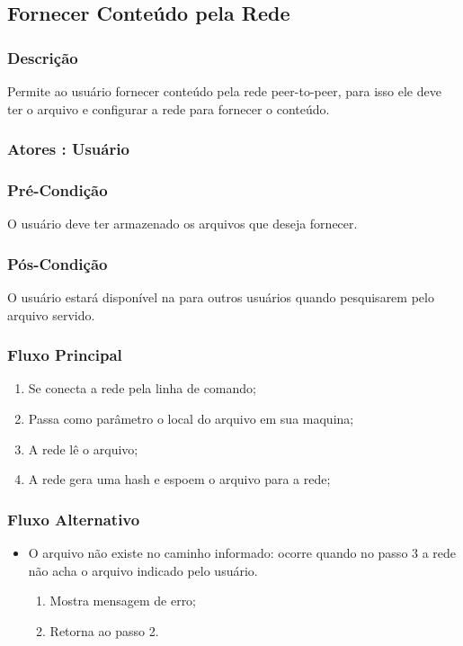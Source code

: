 \subsection{Fornecer Conteúdo pela Rede}
\subsubsection{Descrição}
Permite ao usuário fornecer conteúdo pela rede peer-to-peer, para isso ele deve ter o arquivo e configurar a rede para fornecer o conteúdo.
\subsubsection{Atores : Usuário}
\subsubsection{Pré-Condição}
O usuário deve ter armazenado os arquivos que deseja fornecer.
\subsubsection{Pós-Condição}
O usuário estará disponível na para outros usuários quando pesquisarem pelo arquivo servido. 
\subsubsection{Fluxo Principal}
\begin{enumerate}
    \item Se conecta a rede pela linha de comando;
    \item Passa como parâmetro o local do arquivo em sua maquina;
    \item A rede lê o arquivo;
    \item A rede gera uma hash e espoem o arquivo para a rede;
\end{enumerate}
\subsubsection{Fluxo Alternativo}
\begin{itemize}
    \item O arquivo não existe no caminho informado: ocorre quando no passo 3 a rede não acha o arquivo indicado pelo usuário.
    \begin{enumerate}
        \item Mostra mensagem de erro;
        \item Retorna ao passo 2.
    \end{enumerate}
\end{itemize}


